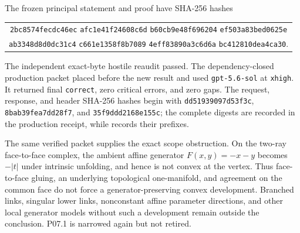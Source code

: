 The frozen principal statement and proof have SHA-256 hashes
\begin{center}
\small
\begin{tabular}{@{}c@{}}
\texttt{2bc8574fecdc46ec}\allowbreak
\texttt{afc1e41f24608c6d}\allowbreak
\texttt{b60cb9e48f696204}\allowbreak
\texttt{ef503a83bed0625e}\\
\texttt{ab3348d8d0dc31c4}\allowbreak
\texttt{c661e1358f8b7089}\allowbreak
\texttt{4eff83890a3c6d6a}\allowbreak
\texttt{bc412810dea4ca30}.
\end{tabular}
\end{center}
The independent exact-byte hostile reaudit passed.  The dependency-closed
production packet placed
 before the new result and used
\texttt{gpt-5.6-sol} at \texttt{xhigh}.  It returned final
\texttt{correct}, zero critical errors, and zero gaps.  The request,
response, and header SHA-256 hashes begin with
\texttt{dd51939097d53f3c}, \texttt{8bab39fea7dd28f7}, and
\texttt{35f9ddd2168e155c}; the complete digests are recorded in the
production receipt, while  records their prefixes.

The same verified packet supplies the exact scope obstruction.  On the
two-ray face-to-face complex, the ambient affine generator
\(F(x,y)=-x-y\) becomes \(-|t|\) under intrinsic unfolding, and hence is not
convex at the vertex.  Thus face-to-face gluing, an underlying topological
one-manifold, and agreement on the common face do not force a
generator-preserving convex development.  Branched links, singular lower
links, nonconstant affine parameter directions, and other local generator
models without such a development remain outside the conclusion.  P07.1
is narrowed again but not retired.

